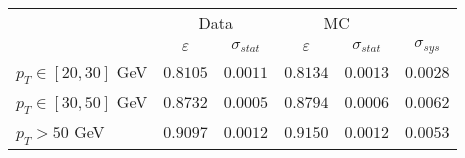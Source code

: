 \begin{tabular}{|l||c|c||c|c||c|}
\hline
&\multicolumn{2}{c||}{Data}&\multicolumn{2}{c||}{MC}&\multicolumn{1}{c|}{}\\ & $\varepsilon$ & $\sigma_{stat}$ & $\varepsilon$ & $\sigma_{stat}$ & $\sigma_{sys}$\\ 
\hline\hline
$p_{T}\in[20,30]$ GeV &  $0.8105$ &  $0.0011$ &  $0.8134$ &  $0.0013$ &  $0.0028$\\ 
$p_{T}\in[30,50]$ GeV &  $0.8732$ &  $0.0005$ &  $0.8794$ &  $0.0006$ &  $0.0062$\\ 
$p_{T} > 50$ GeV &  $0.9097$ &  $0.0012$ &  $0.9150$ &  $0.0012$ &  $0.0053$\\ 
\hline
\end{tabular}

